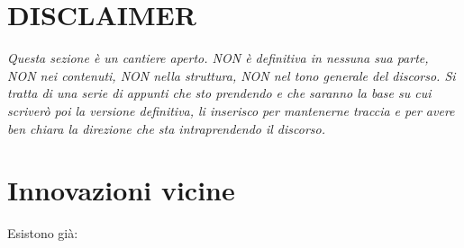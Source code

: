 \section*{DISCLAIMER} \emph{Questa sezione è un cantiere aperto. NON è definitiva in nessuna sua parte, NON nei contenuti, NON nella struttura, NON nel tono generale del discorso. Si tratta di una serie di appunti che sto prendendo e che saranno la base su cui scriverò poi la versione definitiva, li inserisco per mantenerne traccia e per avere ben chiara la direzione che sta intraprendendo il discorso.}


        

\section{Innovazioni vicine}
    Esistono già:
